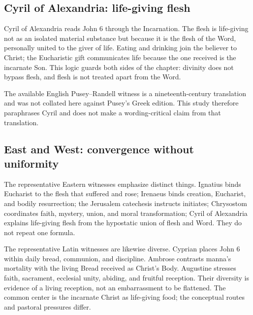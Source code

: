 \subsection{Cyril of Alexandria: life-giving flesh}

Cyril of Alexandria reads John 6 through the Incarnation. The flesh is
life-giving not as an isolated material substance but because it is the flesh
of the Word, personally united to the giver of life. Eating and drinking join
the believer to Christ; the Eucharistic gift communicates life because the
one received is the incarnate Son. This logic guards both sides of the
chapter: divinity does not bypass flesh, and flesh is not treated apart from
the Word.

The available English Pusey--Randell witness is a nineteenth-century
translation and was not collated here against Pusey's Greek edition. This
study therefore paraphrases Cyril and does not make a wording-critical claim
from that translation.

\subsection{East and West: convergence without uniformity}

The representative Eastern witnesses emphasize distinct things. Ignatius
binds Eucharist to the flesh that suffered and rose; Irenaeus binds creation,
Eucharist, and bodily resurrection; the Jerusalem catechesis instructs
initiates; Chrysostom coordinates faith, mystery, union, and moral
transformation; Cyril of Alexandria explains life-giving flesh from the
hypostatic union of flesh and Word. They do not repeat one formula.

The representative Latin witnesses are likewise diverse. Cyprian places John
6 within daily bread, communion, and discipline. Ambrose contrasts manna's
mortality with the living Bread received as Christ's Body. Augustine stresses
faith, sacrament, ecclesial unity, abiding, and fruitful reception. Their
diversity is evidence of a living reception, not an embarrassment to be
flattened. The common center is the incarnate Christ as life-giving food; the
conceptual routes and pastoral pressures differ.

